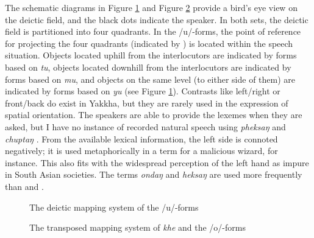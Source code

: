 The schematic diagrams in Figure \ref{deicticschema-1} and Figure \ref{deicticschema-2} provide a bird's eye view on the deictic field, and the black dots indicate the speaker. In both sets, the deictic field is partitioned into four quadrants. In the /u/-forms, the point of reference  for projecting the four quadrants (indicated by ) is located within the speech situation. Objects located uphill from the interlocutors are indicated by forms based on \emph{tu}, objects located downhill  from the interlocutors are indicated by forms based on  \emph{mu}, and objects on the same level (to either side of them) are indicated by forms based on \emph{yu} (see Figure \ref{deicticschema-1}). Contrasts like left/right or front/back do exist in Yakkha, but they are rarely used in the expression of spatial orientation. The speakers are able to provide the lexemes when they are asked, but I have no instance of recorded natural speech using \emph{pheksaŋ}  and \emph{chuptaŋ} . From the available lexical information, the left side is connoted negatively; it is used metaphorically in a term for a malicious wizard, for instance. This also  fits with the widespread perception of the left hand as impure in South Asian societies. The terms \emph{ondaŋ}  and \emph{heksaŋ}  are used more frequently than  and . 


\begin{figure}
\centering
\setlength{\fboxsep}{0pt}
\caption{The deictic mapping system of the /u/-forms}\label{deicticschema-1}
\end{figure}

\bigskip

\begin{figure}
\centering
\setlength{\fboxsep}{0pt}
\caption{The transposed mapping system of  \emph{khe} and the /o/-forms}\label{deicticschema-2}
\end{figure}

